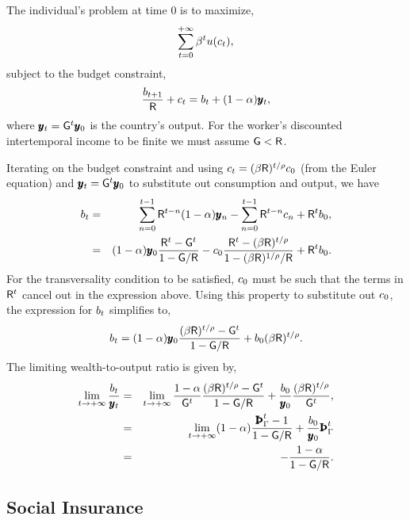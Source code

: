 \documentclass[titlepage,abstract,letterpaper]{econtex}
\renewcommand{\gdpLev}{\ensuremath{\pmb{y}}}
\begin{document}
The individual's problem at time $0$ is to maximize,
\begin{equation*}
\sum_{t=0}^{+\infty} \beta^t u(c_t),
\end{equation*}
subject to the budget constraint,
\begin{equation*}
\frac{\bLev_{t+1}}{\Rfree}+\cLev_t=\bLev_t+ (1-\kapShare) \gdpLev_t,
\end{equation*}
where $\gdpLev_t=\WGro^t \gdpLev_0$ is the country's output. For the worker's discounted intertemporal income to be finite we must assume $\mathsf{G} <\mathsf{R}$.

Iterating on the budget constraint and using $c_t=(\beta \mathsf{R} )^{t/\rho} c_0$ (from the Euler equation) and $\gdpLev_t=\WGro^t \gdpLev_0$ to substitute out consumption and output, we have
\begin{eqnarray*}
\bLev_t&=&\sum_{n=0}^{t-1}\Rfree^{t-n} (1-\kapShare) \gdpLev_n - \sum_{n=0}^{t-1}\Rfree^{t-n} \cLev_n+\Rfree^t \bLev_0,
\\ &=& (1-\kapShare) \gdpLev_0 \frac{\Rfree^t -\WGro^t}{1-\WGro/\Rfree}-\cLev_0 \frac{\Rfree^t -(\Discount \Rfree )^{t/\CRRA}}{1-(\Discount \Rfree )^{1/\CRRA}/\Rfree}+\Rfree^t \bLev_0.
\end{eqnarray*}
For the transversality condition to be satisfied, $c_0$ must be such that the terms in $\mathsf{R}^t$ cancel out in the expression above. Using this property to substitute out $c_0$, the expression for $b_t$ simplifies to,
\begin{equation*}
\bLev_t = (1-\kapShare) \gdpLev_0 \frac{(\Discount \Rfree )^{t/\CRRA}-\WGro^t}{1-\WGro/\Rfree} +\bLev_0 (\Discount \Rfree )^{t/\CRRA}.
\end{equation*}
The limiting wealth-to-output ratio is given by,
\begin{eqnarray*}
\lim_{t \rightarrow +\infty} \frac{\bLev_t}{\gdpLev_t}&=& \lim_{t \rightarrow +\infty}
\frac{1-\kapShare}{\WGro^{t}} \frac{(\Discount \Rfree )^{t/\CRRA}-\WGro^t}{1-\WGro/\Rfree}
+\frac{\bLev_0}{\gdpLev_0}\frac{(\Discount \Rfree )^{t/\CRRA}}{\WGro^t},  \\
 &=& \lim_{t \rightarrow +\infty}(1-\kapShare) \frac{\PatPGro^t-1}{1-\WGro/\Rfree}+\frac{\bLev_0}{\gdpLev_0}\PatPGro^t  \\
 &=& -\frac{1-\kapShare}{1-\WGro/\Rfree}.
 \end{eqnarray*}

\subsection{Social Insurance}
\end{document}
